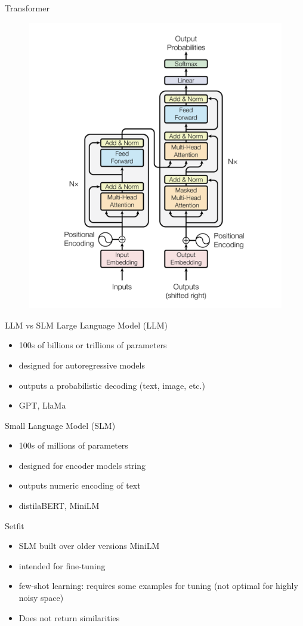 \documentclass{beamer}
\begin{document}
\begin{frame}{Transformer}
\begin{figure}
    \centering
    \includegraphics[width=0.5\linewidth]{images/architecture.png}
    \label{fig:enter-label}
\end{figure}

\end{frame}

\begin{frame}{LLM vs SLM}
    Large Language Model (LLM)
    \begin{itemize}
        \item 100s of billions or trillions of parameters
        \item designed for autoregressive models
        \item outputs a probabilistic decoding (text, image, etc.)
        \item GPT, LlaMa
    \end{itemize}
     Small Language Model (SLM)
    \begin{itemize}
        \item 100s of millions of parameters
        \item designed for encoder models
        string
        \item outputs numeric encoding of text
        \item distilaBERT, MiniLM
    \end{itemize}
   
\end{frame}


\begin{frame}{Setfit}
\begin{itemize}
    \item SLM built over older versions MiniLM 
    \item intended for fine-tuning
    \item few-shot learning: requires some examples for tuning (not optimal for highly noisy space)
    \item Does not return similarities
\end{itemize}
\end{frame}
\end{document}
